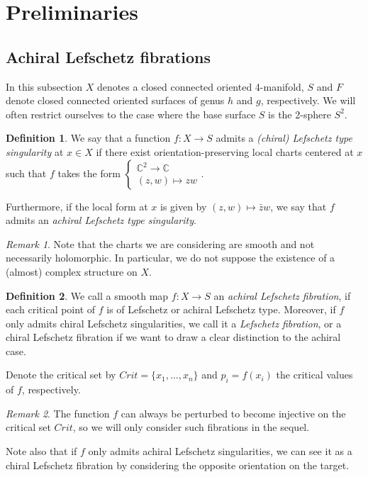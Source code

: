 \documentclass{article}
\theoremstyle{plain}
\theoremstyle{remark}
\newtheorem*{rem}{Remark}
\theoremstyle{definition}
\newtheorem{defin}{Definition}[section]
\begin{document}
\section{Preliminaries}
\subsection{Achiral Lefschetz fibrations}
In this subsection $X$ denotes a closed connected oriented 4-manifold, $S$ and $F$ denote closed connected oriented surfaces of genus $h$ and $g$, respectively. We will often restrict ourselves to the case where the base surface $S$ is the 2-sphere $S^2$. \par 
\begin{defin}
    We say that a function $f:X\to S$ admits a \emph{(chiral) Lefschetz type singularity} at $x\in X$ if there exist orientation-preserving local charts centered at $x$ such that $f$ takes the form $\begin{cases}
        \mathbb{C}^2 \to \mathbb{C}\\
        (z,w) \mapsto zw
    \end{cases}$. \par 
    Furthermore, if the local form at $x$ is given by $(z,w)\mapsto \bar{z}w$, we say that $f$ admits an \emph{achiral Lefschetz type singularity}.
\end{defin}
    \begin{rem}
        Note that the charts we are considering are smooth and not necessarily holomorphic. In particular, we do not suppose the existence of a (almost) complex structure on $X$. 
    \end{rem}
\begin{defin}
    We call a smooth map $f:X\to S$ an \emph{achiral Lefschetz fibration}, if each critical point of $f$ is of Lefschetz or achiral Lefschetz type. Moreover, if $f$ only admits chiral Lefschetz singularities, we call it a \emph{Lefschetz fibration}, or a chiral Lefschetz fibration if we want to draw a clear distinction to the achiral case. \par 
    Denote the critical set by $Crit=\{x_1,\dots,x_n\}$ and $p_i=f(x_i)$ the critical values of $f$, respectively.
\end{defin}
\begin{rem}
    The function $f$ can always be perturbed to become injective on the critical set $Crit$, so we will only consider such fibrations in the sequel. \par 
    Note also that if $f$ only admits achiral Lefschetz singularities, we can see it as a chiral Lefschetz fibration by considering the opposite orientation on the target. %
\end{rem}
\end{document}
